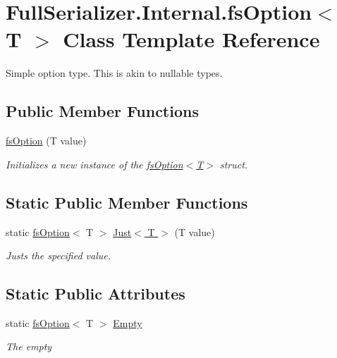 \hypertarget{struct_full_serializer_1_1_internal_1_1fs_option}{}\section{Full\+Serializer.\+Internal.\+fs\+Option$<$ T $>$ Class Template Reference}
\label{struct_full_serializer_1_1_internal_1_1fs_option}


Simple option type. This is akin to nullable types.  


\subsection*{Public Member Functions}
\begin{DoxyCompactItemize}
\item 
\hyperlink{struct_full_serializer_1_1_internal_1_1fs_option_a2f7a2155bfce90df62b19977bf6c1e28}{fs\+Option} (T value)
\begin{DoxyCompactList}\small\item\em Initializes a new instance of the \hyperlink{struct_full_serializer_1_1_internal_1_1fs_option_a2f7a2155bfce90df62b19977bf6c1e28}{fs\+Option$<$\+T$>$} struct. \end{DoxyCompactList}\end{DoxyCompactItemize}
\subsection*{Static Public Member Functions}
\begin{DoxyCompactItemize}
\item 
static \hyperlink{struct_full_serializer_1_1_internal_1_1fs_option}{fs\+Option}$<$ T $>$ \hyperlink{struct_full_serializer_1_1_internal_1_1fs_option_a1d4812c279027074394852b9d4305725}{Just$<$ T $>$} (T value)
\begin{DoxyCompactList}\small\item\em Justs the specified value. \end{DoxyCompactList}\end{DoxyCompactItemize}
\subsection*{Static Public Attributes}
\begin{DoxyCompactItemize}
\item 
static \hyperlink{struct_full_serializer_1_1_internal_1_1fs_option}{fs\+Option}$<$ T $>$ \hyperlink{struct_full_serializer_1_1_internal_1_1fs_option_a097ca5b76a5fe79d6b37dd76ec2b5844}{Empty}
\begin{DoxyCompactList}\small\item\em The empty \end{DoxyCompactList}\end{DoxyCompactItemize}

